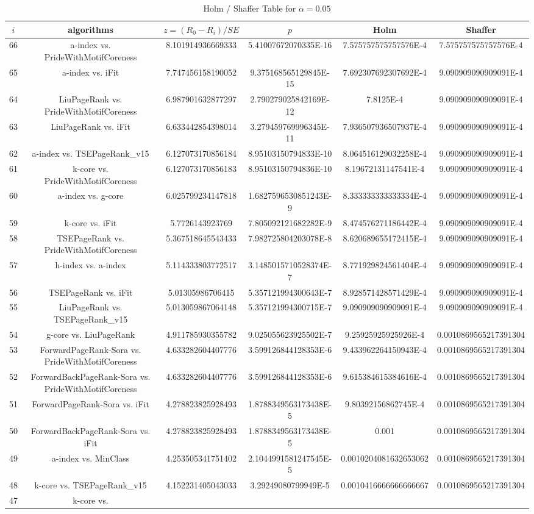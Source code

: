 \documentclass[a4paper,10pt]{article}
\begin{document}
\begin{landscape}
\begin{table}[!htp]
\centering\tiny
\caption{Holm / Shaffer Table for $\alpha=0.05$}
\begin{tabular}{cccccc}
$i$&algorithms&$z=(R_0 - R_i)/SE$&$p$&Holm&Shaffer\\
\hline
66&a-index vs. PrideWithMotifCoreness&8.101914936669333&5.41007672070335E-16&7.575757575757576E-4&7.575757575757576E-4\\65&a-index vs. iFit&7.747456158190052&9.375168565129845E-15&7.692307692307692E-4&9.090909090909091E-4\\64&LiuPageRank vs. PrideWithMotifCoreness&6.987901632877297&2.790279025842169E-12&7.8125E-4&9.090909090909091E-4\\63&LiuPageRank vs. iFit&6.633442854398014&3.279459769996345E-11&7.936507936507937E-4&9.090909090909091E-4\\62&a-index vs. TSEPageRank_v15&6.127073170856184&8.95103150794833E-10&8.064516129032258E-4&9.090909090909091E-4\\61&k-core vs. PrideWithMotifCoreness&6.127073170856183&8.95103150794836E-10&8.19672131147541E-4&9.090909090909091E-4\\60&a-index vs. g-core&6.025799234147818&1.6827596530851243E-9&8.333333333333334E-4&9.090909090909091E-4\\59&k-core vs. iFit&5.7726143923769&7.805092121682282E-9&8.474576271186442E-4&9.090909090909091E-4\\58&TSEPageRank vs. PrideWithMotifCoreness&5.367518645543433&7.982725804203078E-8&8.620689655172415E-4&9.090909090909091E-4\\57&h-index vs. a-index&5.114333803772517&3.1485015710528374E-7&8.771929824561404E-4&9.090909090909091E-4\\56&TSEPageRank vs. iFit&5.01305986706415&5.357121994300643E-7&8.928571428571429E-4&9.090909090909091E-4\\55&LiuPageRank vs. TSEPageRank_v15&5.013059867064148&5.357121994300715E-7&9.090909090909091E-4&9.090909090909091E-4\\54&g-core vs. LiuPageRank&4.911785930355782&9.025055623925502E-7&9.25925925925926E-4&0.0010869565217391304\\53&ForwardPageRank-Sora vs. PrideWithMotifCoreness&4.633282604407776&3.599126844128353E-6&9.433962264150943E-4&0.0010869565217391304\\52&ForwardBackPageRank-Sora vs. PrideWithMotifCoreness&4.633282604407776&3.599126844128353E-6&9.615384615384616E-4&0.0010869565217391304\\51&ForwardPageRank-Sora vs. iFit&4.278823825928493&1.8788349563173438E-5&9.80392156862745E-4&0.0010869565217391304\\50&ForwardBackPageRank-Sora vs. iFit&4.278823825928493&1.8788349563173438E-5&0.001&0.0010869565217391304\\49&a-index vs. MinClass&4.253505341751402&2.1044991581247545E-5&0.0010204081632653062&0.0010869565217391304\\48&k-core vs. TSEPageRank_v15&4.152231405043033&3.29249080799949E-5&0.0010416666666666667&0.0010869565217391304\\47&k-core vs. 
\end{tabular}
\end{table}
\end{landscape}
\end{document}
